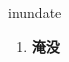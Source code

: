 
\begin{frame}
{\huge inundate}
\begin{center}
\begin{enumerate}\Large
  \item \textbf{淹没}
\end{enumerate}
\end{center}
\end{frame}
